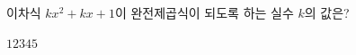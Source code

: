 이차식 $kx^2+kx+1$이 완전제곱식이 되도록 하는 실수 $k$의 값은?
\begin{choices32}{$1$}{$2$}{$3$}{$4$}{$5$}\end{choices32}
